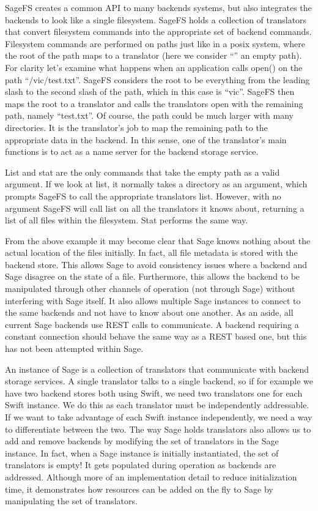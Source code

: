 SageFS creates a common API to many backends systems, but also integrates the backends to look like a single filesystem. SageFS holds a collection of translators that convert filesystem commands into the appropriate set of backend commands. Filesystem commands are performed on paths just like in a posix system, where the root of the path maps to a translator (here we consider ``'' an empty path). For clarity let's examine what happens when an application calls open() on the path ``/vic/test.txt''. SageFS considers the root to be everything from the leading slash to the second slash of the path, which in this case is ``vic''. SageFS then maps the root to a translator and calls the translators open with the remaining path, namely ``test.txt''. Of course, the path could be much larger with many directories. It is the translator's job to map the remaining path to the appropriate data in the backend. In this sense, one of the translator's main functions is to act as a name server for the backend storage service.

List and stat are the only commands that take the empty path as a valid argument. If we look at list, it normally takes a directory as an argument, which prompts SageFS to call the appropriate translators list. However, with no argument SageFS will call list on all the translators it knows about, returning a list of all files within the filesystem. Stat performs the same way.

From the above example it may become clear that Sage knows nothing about the actual location of the files initially. In fact, all file metadata is stored with the backend store. This allows Sage to avoid consistency issues where a backend and Sage disagree on the state of a file. Furthermore, this allows the backend to be manipulated through other channels of operation (not through Sage) without interfering with Sage itself. It also allows multiple Sage instances to connect to the same backends and not have to know about one another. As an aside, all current Sage backends use REST calls to communicate. A backend requiring a constant connection should behave the same way as a REST based one, but this has not been attempted within Sage.

An instance of Sage is a collection of translators that communicate with backend storage services. A single translator talks to a single backend, so if for example we have two backend stores both using Swift, we need two translators one for each Swift instance. We do this as each translator must be independently addressable. If we want to take advantage of each Swift instance independently, we need a way to differentiate between the two. The way Sage holds translators also allows us to add and remove backends by modifying the set of translators in the Sage instance. In fact, when a Sage instance is initially instantiated, the set of translators is empty! It gets populated during operation as backends are addressed. Although more of an implementation detail to reduce initialization time, it demonstrates how resources can be added on the fly to Sage by manipulating the set of translators.

